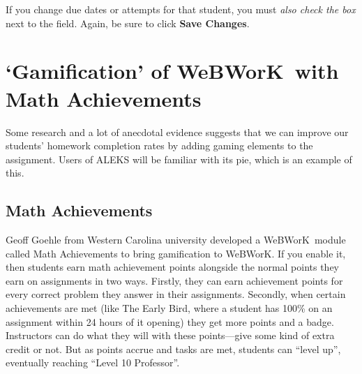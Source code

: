 \documentclass[12pt]{article}
\newcommand{\menu}[1]{\textbf{#1}}
\newcommand{\WW}{WeBWorK}
\begin{document}
If you change due dates or attempts for that student, you must \emph{also check the box} next to the field.  Again, be sure to click \menu{Save Changes}.

\section{`Gamification' of \WW\ with Math Achievements}\label{gamification}

Some research and a lot of anecdotal evidence suggests that we can improve our students' homework completion rates by adding gaming elements to the assignment. Users of ALEKS will be familiar with its pie, which is an example of this.

\subsection{Math Achievements}

Geoff Goehle from Western Carolina university developed a \WW\ module called Math Achievements to bring gamification to \WW. If you enable it, then students earn math achievement points alongside the normal points they earn on assignments in two ways. Firstly, they can earn achievement points for every correct problem they answer in their assignments. Secondly, when certain achievements are met (like The Early Bird, where a student has 100\% on an assignment within 24 hours of it opening) they get more points and a badge. Instructors can do what they will with these points---give some kind of extra credit or not. But as points accrue and tasks are met, students can ``level up'', eventually reaching ``Level 10 Professor''. 
\end{document}
